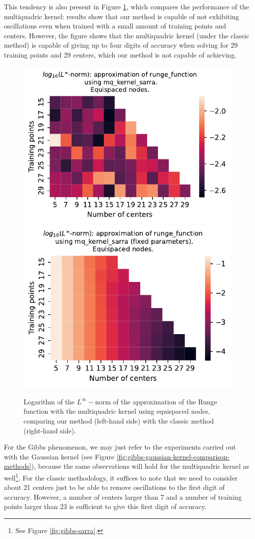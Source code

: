 \documentclass[12pt]{report} %
\begin{document}
This tendency is also present in Figure \ref{fig:runge-Kmq_kernel_sarra-comparison-methods}, which compares the performance of the multiquadric kernel: %
results show that our method is capable of not exhibiting oscillations even when trained with a small amount of training points and centers. 
However, the figure shows that the multiquadric kernel (under the classic method) is capable of giving up to four digits of accuracy when solving for 29 training points and 29 centers, which our method is not capable of achieving.

\begin{figure}[ht]
    \centering
    
    \includegraphics[width=.49\textwidth]{imagenes/experiments/1d/variational/runge_function-Kmq_kernel_sarra-Equi.pdf}
    \includegraphics[width=.49\textwidth]{imagenes/experiments/1d/least_squares/opt-runge_function-Kmq_kernel_sarra-Equi.pdf}
    \caption{Logarithm of the $L^\infty-$norm of the approximation of the Runge function with the multiquadric kernel using equispaced nodes, comparing our method (left-hand side) with the classic method (right-hand side).}
    \label{fig:runge-Kmq_kernel_sarra-comparison-methods}
\end{figure}

For the Gibbs phenomenon, we may just refer to the experiments carried out
with the Gaussian kernel (see Figure
\ref{fig:gibbs-gaussian-kernel-comparison-methods}), because the same
observations will hold for the multiquadric kernel as well\footnote{See Figure \ref{fig:gibbs-sarra}.}. For the
classic methodology, it suffices to note that we need to consider
about 21 centers just to be able to remove oscillations to the first digit of
accuracy. However, a number of centers larger than 7 and a number of training
points larger than 23 is sufficient to give this first digit of accuracy. 
\end{document}
